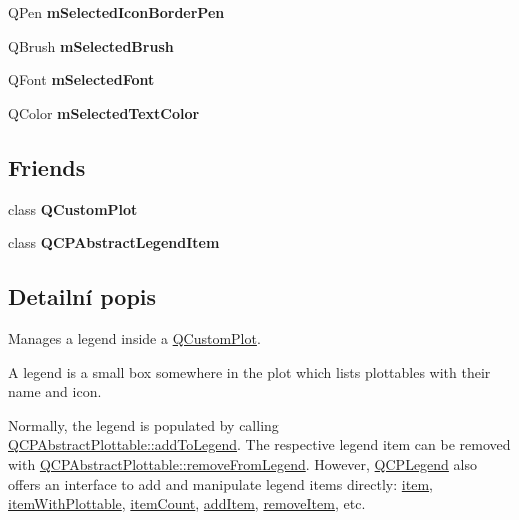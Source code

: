 \begin{DoxyCompactItemize}
\item 
\hypertarget{classQCPLegend_a7429ac0e64c7b90b649b4d8f4cc5fa55}{}Q\+Pen {\bfseries m\+Selected\+Icon\+Border\+Pen}\label{classQCPLegend_a7429ac0e64c7b90b649b4d8f4cc5fa55}

\item 
\hypertarget{classQCPLegend_ab3c7567c86d4784b1e48f76a84b3a1e2}{}Q\+Brush {\bfseries m\+Selected\+Brush}\label{classQCPLegend_ab3c7567c86d4784b1e48f76a84b3a1e2}

\item 
\hypertarget{classQCPLegend_a86ce8f6c20a2f51a48eaf3c24ce16805}{}Q\+Font {\bfseries m\+Selected\+Font}\label{classQCPLegend_a86ce8f6c20a2f51a48eaf3c24ce16805}

\item 
\hypertarget{classQCPLegend_a6c25c8796c6e73e983aae6024965f2be}{}Q\+Color {\bfseries m\+Selected\+Text\+Color}\label{classQCPLegend_a6c25c8796c6e73e983aae6024965f2be}

\end{DoxyCompactItemize}
\subsection*{Friends}
\begin{DoxyCompactItemize}
\item 
\hypertarget{classQCPLegend_a1cdf9df76adcfae45261690aa0ca2198}{}class {\bfseries Q\+Custom\+Plot}\label{classQCPLegend_a1cdf9df76adcfae45261690aa0ca2198}

\item 
\hypertarget{classQCPLegend_a8a375e31e42c68de049fcf0fd35db5b0}{}class {\bfseries Q\+C\+P\+Abstract\+Legend\+Item}\label{classQCPLegend_a8a375e31e42c68de049fcf0fd35db5b0}

\end{DoxyCompactItemize}


\subsection{Detailní popis}
Manages a legend inside a \hyperlink{classQCustomPlot}{Q\+Custom\+Plot}. 

A legend is a small box somewhere in the plot which lists plottables with their name and icon.

Normally, the legend is populated by calling \hyperlink{classQCPAbstractPlottable_a70f8cabfd808f7d5204b9f18c45c13f5}{Q\+C\+P\+Abstract\+Plottable\+::add\+To\+Legend}. The respective legend item can be removed with \hyperlink{classQCPAbstractPlottable_aa1f350e510326d012b9a9c9249736c83}{Q\+C\+P\+Abstract\+Plottable\+::remove\+From\+Legend}. However, \hyperlink{classQCPLegend}{Q\+C\+P\+Legend} also offers an interface to add and manipulate legend items directly\+: \hyperlink{classQCPLegend_a454272d7094437beb3278a2294006da5}{item}, \hyperlink{classQCPLegend_a5ee80cf83f65e3b6dd386942ee3cc1ee}{item\+With\+Plottable}, \hyperlink{classQCPLegend_a198228e9cdc78d3a3c306fa6763d0404}{item\+Count}, \hyperlink{classQCPLegend_a3ab274de52d2951faea45a6d975e6b3f}{add\+Item}, \hyperlink{classQCPLegend_ac91595c3eaa746fe6321d2eb952c63bb}{remove\+Item}, etc.


